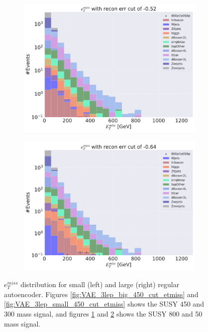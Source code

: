 \begin{figure}[H]
    \hfill
    \begin{subfigure}{.45\textwidth}
        \includegraphics[width=\textwidth]{Figures/VAE_testing/big/3lep/b_data_recon_big_rm3_feats_sig_800p0p050p_etmiss_recon_errcut_-0.52.pdf}
        \caption{}
        \label{fig:VAE_3lep_big_800_cut_etmiss}
    \end{subfigure}
    \hfill   
    \begin{subfigure}{.45\textwidth}
        \includegraphics[width=\textwidth]{Figures/VAE_testing/small/3lep/b_data_recon_big_rm3_feats_sig_800p0p050p_etmiss_recon_errcut_-0.64.pdf}
        \caption{}
        \label{fig:VAE_3lep_small_800_cut_etmiss}
    \end{subfigure}
    \hfill      
    \caption[Some $e_T^{miss}$ cuts for VAE]{$e_T^{miss}$ distribution for small (left) and large (right) regular autoencoder.
    Figures \ref{fig:VAE_3lep_big_450_cut_etmiss} and \ref{fig:VAE_3lep_small_450_cut_etmiss} shows the SUSY 450 and 300 mass signal, 
    and figures \ref{fig:VAE_3lep_big_800_cut_etmiss} and \ref{fig:VAE_3lep_small_800_cut_etmiss} shows the SUSY 800 and 50 mass signal.}
    \label{fig:VAE_3lep_recon_err_both_sig_cut_etmiss}
\end{figure}

